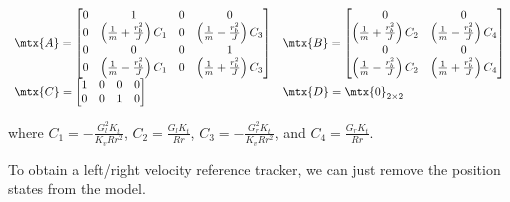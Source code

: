 \begin{equation*}
  \begin{array}{ll}
    \mtx{A} =
    \begin{bmatrix}
      0 & 1 & 0 & 0 \\
      0 & \left(\frac{1}{m} + \frac{r_b^2}{J}\right) C_1 & 0 & \left(\frac{1}{m} - \frac{r_b^2}{J}\right) C_3 \\
      0 & 0 & 0 & 1 \\
      0 & \left(\frac{1}{m} - \frac{r_b^2}{J}\right) C_1 & 0 & \left(\frac{1}{m} + \frac{r_b^2}{J}\right) C_3
    \end{bmatrix} &
    \mtx{B} =
    \begin{bmatrix}
      0 & 0 \\
      \left(\frac{1}{m} + \frac{r_b^2}{J}\right) C_2 & \left(\frac{1}{m} - \frac{r_b^2}{J}\right) C_4 \\
      0 & 0 \\
      \left(\frac{1}{m} - \frac{r_b^2}{J}\right) C_2 & \left(\frac{1}{m} + \frac{r_b^2}{J}\right) C_4
    \end{bmatrix} \\
    \mtx{C} =
    \begin{bmatrix}
      1 & 0 & 0 & 0 \\
      0 & 0 & 1 & 0 \\
    \end{bmatrix} &
    \mtx{D} = \mtx{0}_{2 \times 2}
  \end{array}
\end{equation*}

where $C_1 = -\frac{G_l^2 K_t}{K_v R r^2}$, $C_2 = \frac{G_l K_t}{Rr}$,
$C_3 = -\frac{G_r^2 K_t}{K_v R r^2}$, and $C_4 = \frac{G_r K_t}{Rr}$.

To obtain a left/right velocity \gls{reference} tracker, we can just remove the
position \glspl{state} from the \gls{model}.

